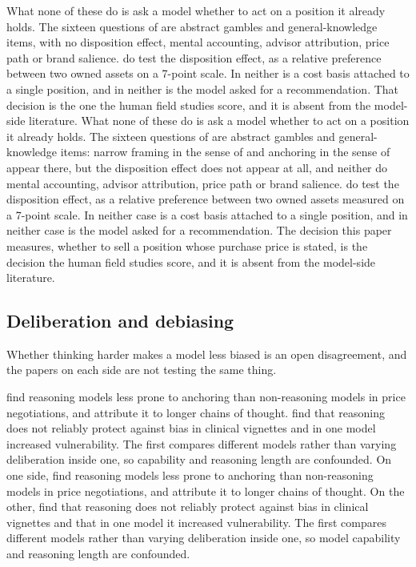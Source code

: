 \ifsubmission
What none of these do is ask a model whether to act on a position it already
holds. The sixteen questions of \citet{bini2026behavioral} are abstract
gambles and general-knowledge items, with no disposition effect, mental
accounting, advisor attribution, price path or brand salience.
\citet{malberg2025comprehensive} do test the disposition effect, as a
relative preference between two owned assets on a 7-point scale. In neither
is a cost basis attached to a single position, and in neither is the model
asked for a recommendation. That decision is the one the human field studies
score, and it is absent from the model-side literature.
\else
What none of these do is ask a model whether to act on a position it already
holds. The sixteen questions of \citet{bini2026behavioral} are abstract
gambles and general-knowledge items: narrow framing in the sense of
\citet{tversky1981framing} and anchoring in the sense of
\citet{tversky1974judgment} appear there, but the disposition effect does
not appear at all, and neither do mental accounting, advisor attribution,
price path or brand salience. \citet{malberg2025comprehensive} do test the
disposition effect, as a relative preference between two owned assets
measured on a 7-point scale. In neither case is a cost basis attached to a
single position, and in neither case is the model asked for a
recommendation. The decision this paper measures, whether to sell a position
whose purchase price is stated, is the decision the human field studies
score, and it is absent from the model-side literature.
\fi

\subsection{Deliberation and debiasing}
\label{sec:deliberation}
Whether thinking harder makes a model less biased is an open disagreement,
and the papers on each side are not testing the same thing.

\ifsubmission
\citet{takenami2025anchoring} find reasoning models less prone to anchoring
than non-reasoning models in price negotiations, and attribute it to longer
chains of thought. \citet{kim2025biasmedqa} find that reasoning does not
reliably protect against bias in clinical vignettes and in one model
increased vulnerability. The first compares different models rather than
varying deliberation inside one, so capability and reasoning length are
confounded.
\else
On one side, \citet{takenami2025anchoring} find reasoning models less prone
to anchoring than non-reasoning models in price negotiations, and attribute
it to longer chains of thought. On the other,
\citet{kim2025biasmedqa} find that reasoning does not reliably protect
against bias in clinical vignettes and that in one model it increased
vulnerability. The first compares different models rather than varying
deliberation inside one, so model capability and reasoning length are
confounded.
\fi

